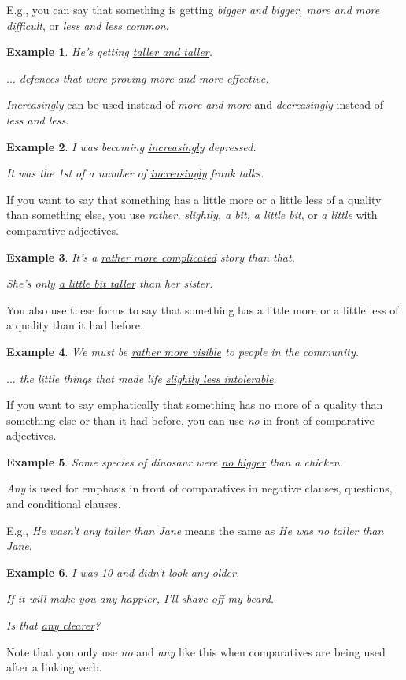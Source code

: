 \documentclass[oneside]{book}
\numberwithin{equation}{section}
\newtheorem{example}{Example}[section]
\begin{document}
E.g., you can say that something is getting \textit{bigger and bigger, more and more difficult}, or \textit{less and less common}.
\begin{example}
    He's getting \underline{taller and taller}.
    
    $\ldots$ defences that were proving \underline{more and more effective}.
\end{example}
\textit{Increasingly} can be used instead of \textit{more and more} and \textit{decreasingly} instead of \textit{less and less}.
\begin{example}
    I was becoming \underline{increasingly} depressed.
    
    It was the 1st of a number of \underline{increasingly} frank talks.
\end{example}
%
\noindent{} If you want to say that something has a little more or a little less of a quality than something else, you use \textit{rather, slightly, a bit, a little bit}, or \textit{a little} with comparative adjectives.
\begin{example}
    It's a \underline{rather more complicated} story than that.
    
    She's only \underline{a little bit taller} than her sister.
\end{example}
You also use these forms to say that something has a little more or a little less of a quality than it had before.
\begin{example}
    We must be \underline{rather more visible} to people in the community.
    
    $\ldots$ the little things that made life \underline{slightly less intolerable}.
\end{example}
%
\noindent{} If you want to say emphatically that something has no more of a quality than something else or than it had before, you can use \textit{no} in front of comparative adjectives.
\begin{example}
    Some species of dinosaur were \underline{no bigger} than a chicken.
\end{example}
\textit{Any} is used for emphasis in front of comparatives in negative clauses, questions, and conditional clauses.

E.g., \textit{He wasn't any taller than Jane} means the same as \textit{He was no taller than Jane}.
\begin{example}
    I was 10 and didn't look \underline{any older}.
    
    If it will make you \underline{any happier}, I'll shave off my beard.
    
    Is that \underline{any clearer}?
\end{example}
Note that you only use \textit{no} and \textit{any} like this when comparatives are being used after a linking verb.
\end{document}
